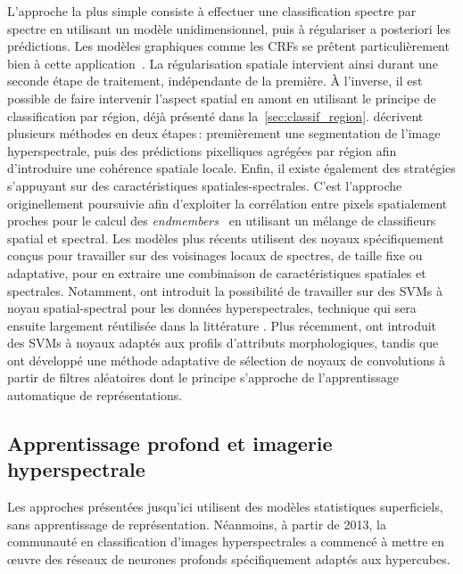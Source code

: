 L'approche la plus simple consiste à effectuer une classification spectre par spectre en utilisant un modèle unidimensionnel, puis à régulariser a posteriori les prédictions. Les modèles graphiques comme les \glspl{CRF} se prêtent particulièrement bien à cette application~\cite{wu_semi-supervised_2016}. La régularisation spatiale intervient ainsi durant une seconde étape de traitement, indépendante de la première.
À l'inverse, il est possible de faire intervenir l'aspect spatial en amont en utilisant le principe de classification par région, déjà présenté dans la~\cref{sec:classif_region}. \citet{tarabalka_segmentation_2010,fauvel_advances_2013} décrivent plusieurs méthodes en deux étapes\,: premièrement une segmentation de l'image hyperspectrale, puis des prédictions pixelliques agrégées par région afin d'introduire une cohérence spatiale locale.
Enfin, il existe également des stratégies s'appuyant sur des caractéristiques spatiales-spectrales. C'est l'approche originellement poursuivie afin d'exploiter la corrélation entre pixels spatialement proches pour le calcul des \textit{endmembers}~\cite{plaza_spatial/spectral_2002,dellacqua_exploiting_2004} en utilisant un mélange de classifieurs spatial et spectral. Les modèles plus récents utilisent des noyaux spécifiquement conçus pour travailler sur des voisinages locaux de spectres, de taille fixe ou adaptative, pour en extraire une combinaison de caractéristiques spatiales et spectrales. Notamment, \citet{camps-valls_composite_2006} ont introduit la possibilité de travailler sur des \glspl{SVM} à noyau spatial-spectral pour les données hyperspectrales, technique qui sera ensuite largement réutilisée dans la littérature \cite{tarabalka_spectralspatial_2009,fauvel_spatial-spectral_2012}. Plus récemment, \citet{cui_scalable_2017} ont introduit des \glspl{SVM} à noyaux adaptés aux profils d'attributs morphologiques, tandis que~\citet{tuia_multiclass_2015} ont développé une méthode adaptative de sélection de noyaux de convolutions à partir de filtres aléatoires dont le principe s'approche de l'apprentissage automatique de représentations.

\subsection{Apprentissage profond et imagerie hyperspectrale}
\label{sec:deep_hsi}

Les approches présentées jusqu'ici utilisent des modèles statistiques superficiels, sans apprentissage de représentation. Néanmoins, à partir de 2013, la communauté en classification d'images hyperspectrales a commencé à mettre en \oe{}uvre des réseaux de neurones profonds spécifiquement adaptés aux hypercubes.

